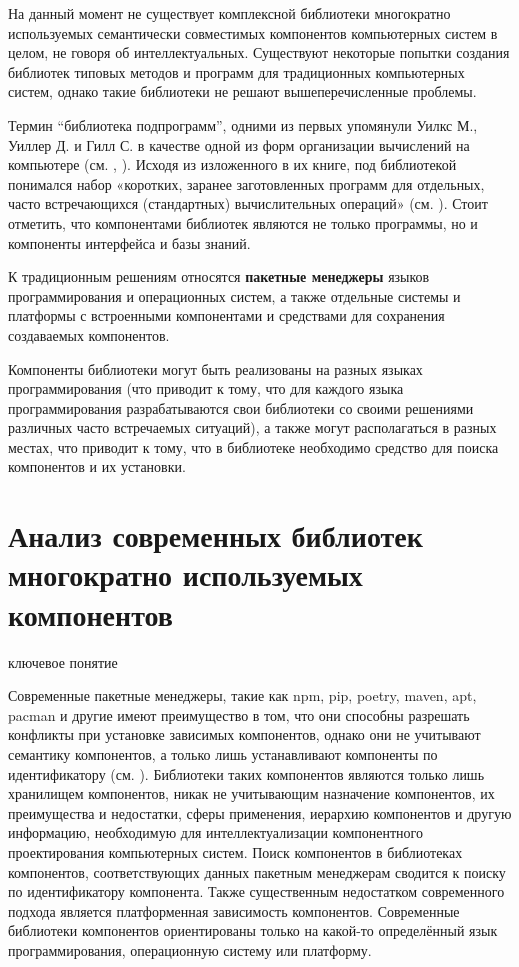 На данный момент не существует комплексной библиотеки многократно используемых семантически совместимых компонентов компьютерных систем в целом, не говоря об интеллектуальных. Существуют некоторые попытки создания библиотек типовых методов и программ для традиционных компьютерных систем, однако такие библиотеки не решают вышеперечисленные проблемы.

Термин ``библиотека подпрограмм'', одними из первых упомянули Уилкс М., Уиллер Д. и Гилл С. в качестве одной из форм организации вычислений на компьютере (см. , ). Исходя из изложенного в их книге, под библиотекой понимался набор «коротких, заранее заготовленных программ для отдельных, часто встречающихся (стандартных) вычислительных операций» (см. ). Стоит отметить, что компонентами библиотек являются не только программы, но и компоненты интерфейса и базы знаний.

К традиционным решениям относятся \textbf{пакетные менеджеры} языков программирования и операционных систем, а также отдельные системы и платформы с встроенными компонентами и средствами для сохранения создаваемых компонентов.

Компоненты библиотеки могут быть реализованы на разных языках программирования (что приводит к тому, что для каждого языка программирования разрабатываются свои библиотеки со своими решениями различных часто встречаемых ситуаций), а также могут располагаться в разных местах, что приводит к тому, что в библиотеке необходимо средство для поиска компонентов и их установки.

\section{Анализ современных библиотек многократно используемых компонентов}
\label{ostis_library_analysis}

\begin{SCn}
\begin{scnrelfromlist}{ключевое понятие}
\end{scnrelfromlist}
\end{SCn}

\bigskip

Современные пакетные менеджеры, такие как npm, pip, poetry, maven, apt, pacman и другие имеют преимущество в том, что они способны разрешать конфликты при установке зависимых компонентов, однако они не учитывают семантику компонентов, а только лишь устанавливают компоненты по идентификатору (см. ). Библиотеки таких компонентов являются только лишь хранилищем компонентов, никак не учитывающим назначение компонентов, их преимущества и недостатки, сферы применения, иерархию компонентов и другую информацию, необходимую для интеллектуализации компонентного проектирования компьютерных систем. Поиск компонентов в библиотеках компонентов, соответствующих данных пакетным менеджерам сводится к поиску по идентификатору компонента. Также существенным недостатком современного подхода является платформенная зависимость компонентов. Современные библиотеки компонентов ориентированы только на какой-то определённый язык программирования, операционную систему или платформу.

